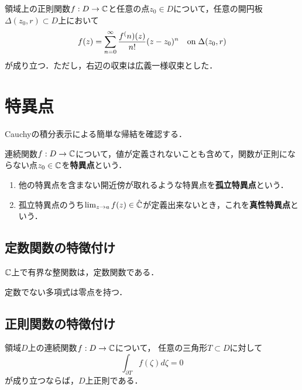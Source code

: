 \documentclass[uplatex, dvipdfmx]{jsreport}
\begin{document}
\begin{corollary}
    領域上の正則関数$f:D\to\mathbb{C}$と任意の点$z_0\in D$について，任意の開円板$\Delta(z_0,r)\subset D$上において
    \[f(z)=\sum^\infty_{n=0}\frac{f^(n)(z)}{n!}(z-z_0)^n\quad\mathrm{on}\;\Delta(z_0,r)\]
    が成り立つ．ただし，右辺の収束は広義一様収束とした．
\end{corollary}

\section{特異点}

\begin{tcolorbox}[colframe=ForestGreen, colback=ForestGreen!10!white,breakable,colbacktitle=ForestGreen!40!white,coltitle=black,fonttitle=\bfseries\sffamily,
title=]
    Cauchyの積分表示による簡単な帰結を確認する．
\end{tcolorbox}

\begin{definition}
    連続関数$f:D\to\mathbb{C}$について，値が定義されないことも含めて，関数が正則にならない点$z_0\in\mathbb{C}$を\textbf{特異点}という．
    \begin{enumerate}
        \item 他の特異点を含まない開近傍が取れるような特異点を\textbf{孤立特異点}という．
        \item 孤立特異点のうち$\lim_{z\to a}f(z)\in\hat{\mathbb{C}}$が定義出来ないとき，これを\textbf{真性特異点}という．
    \end{enumerate}
\end{definition}

\subsection{定数関数の特徴付け}

\begin{corollary}[Liouville]
    $\mathbb{C}$上で有界な整関数は，定数関数である．
\end{corollary}

\begin{corollary}[代数学の基本定理]
    定数でない多項式は零点を持つ．
\end{corollary}

\subsection{正則関数の特徴付け}

\begin{corollary}[Morera]
    領域$D$上の連続関数$f:D\to\mathbb{C}$について，
    任意の三角形$T\subset D$に対して
    \[\int_{\partial T}f(\zeta)d\zeta=0\]
    が成り立つならば，$D$上正則である．
\end{corollary}
\end{document}

